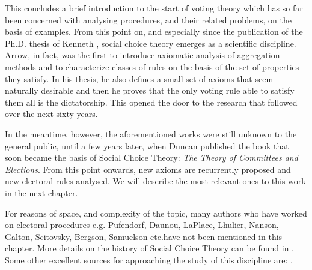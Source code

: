 This concludes a brief introduction to the start of voting theory which has so far been concerned with analysing procedures, and their related problems, on the basis of examples. From this point on, and especially since the publication of the Ph.D. thesis of Kenneth \citet{Arrow1951}, social choice theory emerges as a scientific discipline. Arrow, in fact, was the first to introduce axiomatic analysis of aggregation methods and to characterize classes of rules on the basis of the set of properties they satisfy. In his thesis, he also defines a small set of axioms that seem naturally desirable and then he proves that the only voting rule able to satisfy them all is the dictatorship. This opened the door to the research that followed over the next sixty years.

In the meantime, however, the aforementioned works were still unknown to the general public, until a few years later, when Duncan \citet{Black1958} published the book that soon became the basis of Social Choice Theory: \textit{The Theory of Committees and Elections}. From this point onwards, new axioms are recurrently proposed and new electoral rules analysed. We will describe the most relevant ones to this work in the next chapter.

For reasons of space, and complexity of the topic, many authors who have worked on electoral procedures \textemdash e.g. Pufendorf, Daunou, LaPlace, Lhulier, Nanson, Galton, Scitovsky, Bergson, Samuelson etc.\textemdash have not been mentioned in this chapter. More details on the history of Social Choice Theory can be found in \citet{Black1958,McLeanUrken1995,McLean1990,Urken2004}. Some other excellent sources for approaching the study of this discipline are: \citet{Arrow2002,Arrow2011,Gaertner2006, Fishburn2015, Taylor2005, Nitzan2009}.

